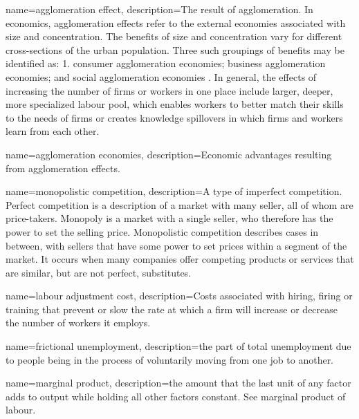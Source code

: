 {
name=agglomeration effect,
description={The result of \gls{agglomeration}. In economics, \glspl{agglomeration effect} refer to the external economies associated with size and concentration. The benefits of size and concentration vary for different cross-sections of the urban population. Three such groupings of benefits may be identified as: 1. consumer agglomeration economies; business agglomeration economies; and social agglomeration economies \cite{carlinoAgglomerationEconomiesSurvey1978}. In general, the effects of increasing the number of firms  or workers in one place include larger, deeper, more specialized labour pool, which enables workers to better match their skills to the needs of firms or creates knowledge spillovers in which firms and workers learn from each other.}
}


{
name=agglomeration economies,
description={Economic advantages %
resulting from \glspl{agglomeration effect}.}
}

{
name=monopolistic competition,
description={A type of  \gls{imperfect competition}. \gls{Perfect competition} is a description of a market with many seller, all of whom are price-takers. Monopoly is a market with a single seller, who therefore has the power to set the selling price. Monopolistic competition describes cases in between, with sellers that have some power to set prices within a segment of the market. It occurs when many companies offer competing products or services that are similar, but are not perfect, substitutes.}
}

{
name=labour adjustment cost,
description={Costs associated with hiring, firing or training that prevent or slow the rate at which a firm will increase or decrease the number of workers it employs.}
}

{
name=frictional unemployment,
description={the part of total unemployment  due to people being in the process of voluntarily moving from one job to another.}
}

{
name=marginal product,
description={the amount that the last unit of any factor  adds to output while holding all other factors constant. See \gls{marginal product of labour}.}
}

